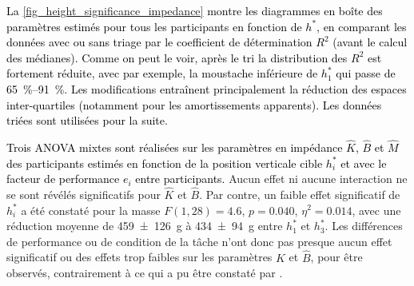
\textcolor{black}{La \cref{fig_height_significance_impedance} montre les diagrammes en boîte des paramètres estimés pour tous les participants en fonction de $h^*$, en comparant les données avec ou sans triage par le coefficient de détermination $R^2$ (avant le calcul des médianes). Comme on peut le voir, après le tri la distribution des $R^2$ est fortement réduite, avec par exemple, la moustache inférieure de $h_1^*$ qui passe de \SIrange{65}{91}{\percent}. Les modifications entraînent principalement la réduction des espaces inter-quartiles (notamment pour les amortissements apparents). Les données triées sont utilisées pour la suite.}

%


\textcolor{black}{Trois ANOVA mixtes sont réalisées sur les paramètres en impédance $\hat{K}$, $\hat{B}$ et $\hat{M}$ des participants estimés en fonction de la position verticale cible $h^*_i$ et avec le facteur de performance $e_i$ entre participants. %
} Aucun effet ni aucune interaction ne se sont révélés significatifs pour $\hat{K}$ et $\hat{B}$. Par contre, un faible effet significatif de $h^*_i$ a été constaté pour la masse $F(1, 28) = 4.6$, $p=0.040$,  $\eta^2 = 0.014$, avec une réduction moyenne de \SI{459\pm126}{\gram} à \SI{434\pm94}{\gram} entre $h^*_1$ et $h^*_3$. Les différences de performance ou de condition de la tâche n'ont donc pas presque aucun effet significatif ou des effets trop faibles sur les paramètres $\hat{K}$ et $\hat{B}$, pour être observés, contrairement à ce qui a pu être constaté par \textcite{erden_end-point_2015}.

